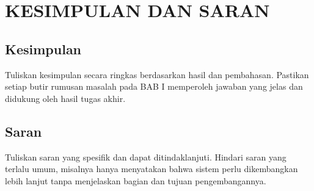 \chapter{KESIMPULAN DAN SARAN}


\section{Kesimpulan}

Tuliskan kesimpulan secara ringkas berdasarkan hasil dan pembahasan. Pastikan setiap butir rumusan masalah pada BAB I memperoleh jawaban yang jelas dan didukung oleh hasil tugas akhir.

\section{Saran}

Tuliskan saran yang spesifik dan dapat ditindaklanjuti. Hindari saran yang terlalu umum, misalnya hanya menyatakan bahwa sistem perlu dikembangkan lebih lanjut tanpa menjelaskan bagian dan tujuan pengembangannya.
